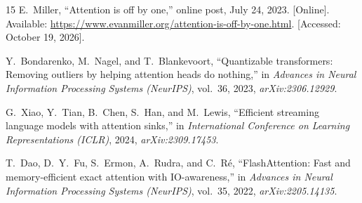 \documentclass[11pt,a4paper]{article}
\begin{document}
\begin{thebibliography}{15}
E.~Miller, ``Attention is off by one,'' online post, July 24, 2023.
[Online]. Available: \url{https://www.evanmiller.org/attention-is-off-by-one.html}.
[Accessed: October 19, 2026].

Y.~Bondarenko, M.~Nagel, and T.~Blankevoort, ``Quantizable transformers: Removing outliers by
helping attention heads do nothing,'' in \emph{Advances in Neural Information Processing
Systems (NeurIPS)}, vol.~36, 2023, \emph{arXiv:2306.12929}.

G.~Xiao, Y.~Tian, B.~Chen, S.~Han, and M.~Lewis, ``Efficient streaming language models with
attention sinks,'' in \emph{International Conference on Learning Representations (ICLR)}, 2024,
\emph{arXiv:2309.17453}.

T.~Dao, D.~Y.~Fu, S.~Ermon, A.~Rudra, and C.~R\'{e}, ``FlashAttention: Fast and memory-efficient
exact attention with IO-awareness,'' in \emph{Advances in Neural Information Processing
Systems (NeurIPS)}, vol.~35, 2022, \emph{arXiv:2205.14135}.
\end{thebibliography}
\end{document}
